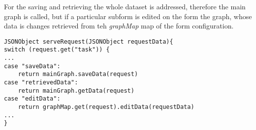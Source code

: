 For the saving and retrieving the whole dataset is addressed, therefore the main graph is called, but if a particular subform is edited on the form the graph, whose data is changes retrieved from teh \textit{graphMap} map of the form configuration. 

\begin{lstlisting}[basicstyle=\footnotesize, frame=single, caption={Loading form data from FormConfiguration}, label=serveRequest, captionpos=b, belowskip=1em, aboveskip=2em]
JSONObject serveRequest(JSONObject requestData){
switch (request.get("task")) {
...
case "saveData": 
	return mainGraph.saveData(request)
case "retrievedData": 
	return mainGraph.getData(request)
case "editData": 
	return graphMap.get(request).editData(requestData)
...		
}
\end{lstlisting}

